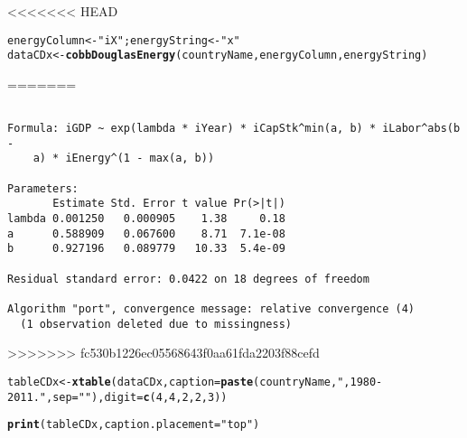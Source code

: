 \documentclass[preprint,authoryear,12pt]{elsarticle}\usepackage{graphicx, color}
\makeatletter
\newcommand{\hlfunctioncall}[1]{\textcolor[rgb]{0.501960784313725,0,0.329411764705882}{\textbf{#1}}}%
\newcommand{\hlstring}[1]{\textcolor[rgb]{0.6,0.6,1}{#1}}%
\newenvironment{kframe}{%
 \def\at@end@of@kframe{}%
 \ifinner\ifhmode%
  \def\at@end@of@kframe{\end{minipage}}%
  \begin{minipage}{\columnwidth}%
 \fi\fi%
 \def\FrameCommand##1{\hskip\@totalleftmargin \hskip-\fboxsep
 \colorbox{shadecolor}{##1}\hskip-\fboxsep
     \hskip-\linewidth \hskip-\@totalleftmargin \hskip\columnwidth}%
 \MakeFramed {\advance\hsize-\width
   \@totalleftmargin\z@ \linewidth\hsize
   \@setminipage}}%
 {\par\unskip\endMakeFramed%
 \at@end@of@kframe}
\newenvironment{knitrout}{}{} %
\makeatother
\begin{document}
<<<<<<< HEAD
\begin{knitrout}
\color{fgcolor}\begin{kframe}
\begin{alltt}
energyColumn <- \hlstring{"iX"}; energyString <- \hlstring{"x"}
dataCDx <- \hlfunctioncall{cobbDouglasEnergy}(countryName, energyColumn, energyString)
\end{alltt}
=======
{\ttfamily\noindent\color{warningcolor}{Warning: longer object length is not a multiple of shorter object length}}\begin{verbatim}

Formula: iGDP ~ exp(lambda * iYear) * iCapStk^min(a, b) * iLabor^abs(b - 
    a) * iEnergy^(1 - max(a, b))

Parameters:
       Estimate Std. Error t value Pr(>|t|)
lambda 0.001250   0.000905    1.38     0.18
a      0.588909   0.067600    8.71  7.1e-08
b      0.927196   0.089779   10.33  5.4e-09

Residual standard error: 0.0422 on 18 degrees of freedom

Algorithm "port", convergence message: relative convergence (4) 
  (1 observation deleted due to missingness)
\end{verbatim}


{\ttfamily\noindent\itshape\color{messagecolor}{Waiting for profiling to be done...}}
>>>>>>> fc530b1226ec05568643f0aa61fda2203f88cefd


{\ttfamily\noindent\bfseries\color{errorcolor}{Error: could not find function "cobbDouglasEnergy"}}\begin{alltt}
tableCDx <- \hlfunctioncall{xtable}(dataCDx, caption=\hlfunctioncall{paste}(countryName, \hlstring{", 1980-2011."}, sep=\hlstring{""}), digit = \hlfunctioncall{c}(4, 4, 2, 2, 3))
\end{alltt}


{\ttfamily\noindent\bfseries\color{errorcolor}{Error: could not find function "xtable"}}\end{kframe}
\end{knitrout}


\begin{kframe}
\begin{alltt}
\hlfunctioncall{print}(tableCDx, caption.placement=\hlstring{"top"})
\end{alltt}


{\ttfamily\noindent\bfseries\color{errorcolor}{Error: error in evaluating the argument 'x' in selecting a method for function 'print': Error: object 'tableCDx' not found}}\end{kframe}
\end{document}
